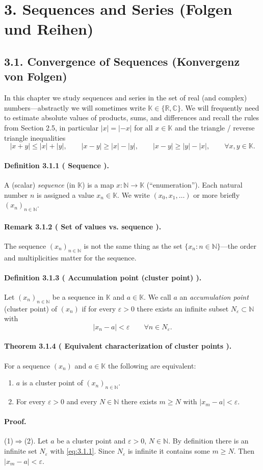 \documentclass[12pt]{article}
\newcommand{\N}{\mathbb{N}}
\newcommand{\R}{\mathbb{R}}
\newcommand{\C}{\mathbb{C}}
\newcommand{\K}{\mathbb{K}} %
\newcommand{\eps}{\varepsilon}
\newcommand{\NumberedDefinition}[3]{%
\paragraph*{Definition #1 ( #2 ).} #3\par}
\newcommand{\NumberedTheorem}[3]{%
\paragraph*{Theorem #1 ( #2 ).} #3\par}
\newcommand{\NumberedRemark}[3]{%
\paragraph*{Remark #1 ( #2 ).} #3\par}
\begin{document}
\section*{3. Sequences and Series (Folgen und Reihen)}

\subsection*{3.1. Convergence of Sequences (Konvergenz von Folgen)}

In this chapter we study sequences and series in the set of real (and complex) numbers—abstractly we will sometimes write $\K\in\{\R,\C\}$. We will frequently need to estimate absolute values of products, sums, and differences and recall the rules from Section 2.5, in particular $|x|=|-x|$ for all $x\in\K$ and the triangle / reverse triangle inequalities
\[
	|x+y|\le |x|+|y|,\qquad |x-y|\ge |x|-|y|,\qquad |x-y|\ge |y|-|x|,\qquad \forall x,y\in\K.
\]

\NumberedDefinition{3.1.1}{Sequence}{A (scalar) \emph{sequence} (in $\K$) is a map $x: \N\to\K$ (``enumeration''). Each natural number $n$ is assigned a value $x_n\in\K$. We write $(x_0,x_1,\dots)$ or more briefly $(x_n)_{n\in\N}$.}

\NumberedRemark{3.1.2}{Set of values vs. sequence}{The sequence $(x_n)_{n\in\N}$ is not the same thing as the set $\{x_n: n\in\N\}$—the order and multiplicities matter for the sequence.}

\NumberedDefinition{3.1.3}{Accumulation point (cluster point)}{Let $(x_n)_{n\in\N}$ be a sequence in $\K$ and $a\in\K$. We call $a$ an \emph{accumulation point} (cluster point) of $(x_n)$ if for every $\eps>0$ there exists an infinite subset $N_\eps\subset \N$ with
\begin{equation}\label{eq:3.1.1}\tag{3.1.1}
	|x_n-a| < \eps \qquad \forall n\in N_\eps.
\end{equation}}

\NumberedTheorem{3.1.4}{Equivalent characterization of cluster points}{For a sequence $(x_n)$ and $a\in\K$ the following are equivalent:
\begin{enumerate}[label={(\arabic*)}, leftmargin=*]
	\item $a$ is a cluster point of $(x_n)_{n\in\N}$.
	\item For every $\eps>0$ and every $N\in\N$ there exists $m\ge N$ with $|x_m-a|<\eps$.
\end{enumerate}}

\paragraph{Proof.} (1)$\Rightarrow$(2). Let $a$ be a cluster point and $\eps>0$, $N\in\N$. By definition there is an infinite set $N_\eps$ with \eqref{eq:3.1.1}. Since $N_\eps$ is infinite it contains some $m\ge N$. Then $|x_m-a|<\eps$.
\end{document}
